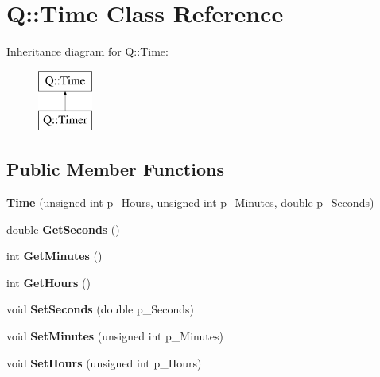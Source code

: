 \hypertarget{class_q_1_1_time}{}\section{Q\+:\+:Time Class Reference}
\label{class_q_1_1_time}
Inheritance diagram for Q\+:\+:Time\+:\begin{figure}[H]
\begin{center}
\leavevmode
\includegraphics[height=2.000000cm]{class_q_1_1_time}
\end{center}
\end{figure}
\subsection*{Public Member Functions}
\begin{DoxyCompactItemize}
\item 
\mbox{\label{class_q_1_1_time_ac72848b1ffb63c184cd312738b5cc2ed}} 
{\bfseries Time} (unsigned int p\+\_\+\+Hours, unsigned int p\+\_\+\+Minutes, double p\+\_\+\+Seconds)
\item 
\mbox{\label{class_q_1_1_time_a2bcb2fc8b2101517aa5b2409b86963a6}} 
double {\bfseries Get\+Seconds} ()
\item 
\mbox{\label{class_q_1_1_time_adade232803ba1570d53182c997829d1c}} 
int {\bfseries Get\+Minutes} ()
\item 
\mbox{\label{class_q_1_1_time_a9000bbd6010a5c20f5c9d0f1bca7bbf8}} 
int {\bfseries Get\+Hours} ()
\item 
\mbox{\label{class_q_1_1_time_a075ce41503d52f7939616eca06cbcfbf}} 
void {\bfseries Set\+Seconds} (double p\+\_\+\+Seconds)
\item 
\mbox{\label{class_q_1_1_time_a5e95992d560c4dacbde1b97135e43104}} 
void {\bfseries Set\+Minutes} (unsigned int p\+\_\+\+Minutes)
\item 
\mbox{\label{class_q_1_1_time_a70ef5e519c1ef050a4d1f37a192177c0}} 
void {\bfseries Set\+Hours} (unsigned int p\+\_\+\+Hours)
\end{DoxyCompactItemize}
